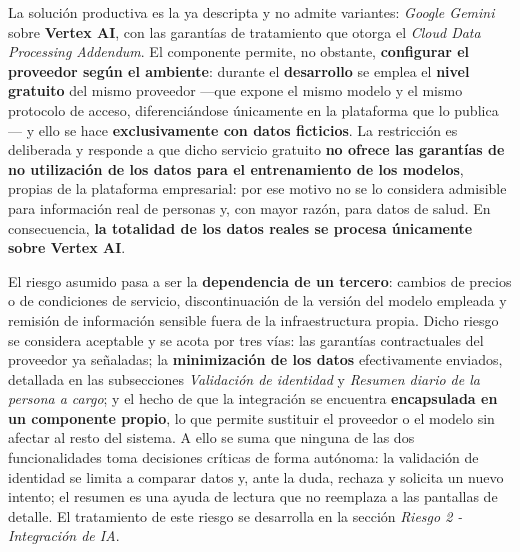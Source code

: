 \documentclass[a4paper,12pt]{article}
\begin{document}
    \par La solución productiva es la ya descripta y no admite variantes: \textit{Google Gemini} sobre \textbf{Vertex AI}, con las garantías de tratamiento que otorga el \textit{Cloud Data Processing Addendum}. El componente permite, no obstante, \textbf{configurar el proveedor según el ambiente}: durante el \textbf{desarrollo} se emplea el \textbf{nivel gratuito} del mismo proveedor —que expone el mismo modelo y el mismo protocolo de acceso, diferenciándose únicamente en la plataforma que lo publica— y ello se hace \textbf{exclusivamente con datos ficticios}. La restricción es deliberada y responde a que dicho servicio gratuito \textbf{no ofrece las garantías de no utilización de los datos para el entrenamiento de los modelos}, propias de la plataforma empresarial: por ese motivo no se lo considera admisible para información real de personas y, con mayor razón, para datos de salud. En consecuencia, \textbf{la totalidad de los datos reales se procesa únicamente sobre Vertex AI}.
    \par El riesgo asumido pasa a ser la \textbf{dependencia de un tercero}: cambios de precios o de condiciones de servicio, discontinuación de la versión del modelo empleada y remisión de información sensible fuera de la infraestructura propia. Dicho riesgo se considera aceptable y se acota por tres vías: las garantías contractuales del proveedor ya señaladas; la \textbf{minimización de los datos} efectivamente enviados, detallada en las subsecciones \textit{Validación de identidad} y \textit{Resumen diario de la persona a cargo}; y el hecho de que la integración se encuentra \textbf{encapsulada en un componente propio}, lo que permite sustituir el proveedor o el modelo sin afectar al resto del sistema. A ello se suma que ninguna de las dos funcionalidades toma decisiones críticas de forma autónoma: la validación de identidad se limita a comparar datos y, ante la duda, rechaza y solicita un nuevo intento; el resumen es una ayuda de lectura que no reemplaza a las pantallas de detalle. El tratamiento de este riesgo se desarrolla en la sección \textit{Riesgo 2 - Integración de IA}.
\end{document}
